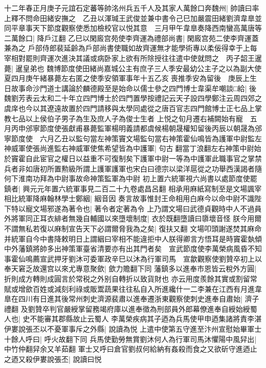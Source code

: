 十二年春正月庚子元誼石定蕃等帥洺州兵五千人及其家人萬餘口奔魏州|{
	帥讀曰率}
上釋不問命田緒安撫之　乙丑以渾瑊王武俊並兼中書令己巳加嚴震田緒劉濟韋臯並同平章事天下節度觀察使悉加檢校官以悦其意　三月甲午韋臯奏降西南蠻高萬唐等二萬餘口|{
	降戶江翻}
乙巳以閑廄宫苑使李齊運為禮部尚書|{
	閑廄宫苑二使李齊運蓋兼為之}
戶部侍郎裴延齡為戶部尚書使職如故齊運無才能學術專以柔佞得幸于上每宰相對罷則齊運次進決其議或病卧家上欲有所除授往往遣中使就問之　丙子韶王暹薨|{
	暹皇弟也}
魏博節度使田緒尚嘉城公主有庶子三人季安最幼公主子之以為副大使夏四月庚午緒暴薨左右匿之使季安領軍事年十五乙亥喪推季安為留後　庚辰上生日故事命沙門道士講論於麟德殿至是始命以儒士參之四門博士韋渠牟嘲談□給|{
	後魏劉芳表云太和二十年立四門博士於四門置學按禮記云天子設四學鄭注云周四郊之虞庠也今以其遼遠故置於四門請移與太學同處從之唐百官志四門館博士正七品上掌教七品以上侯伯子男子為生及庶人子為俊士生者}
上悦之旬月遷右補闕始有寵　五月丙申邠寧節度使張獻甫暴薨監軍楊明義請都虞候楊朝晟權知留後丙辰以朝晟為邠寧節度使　六月乙丑以監句當左神策竇文場監句當右神策霍仙鳴皆為護軍中尉監左神威軍使張尚進監右神威軍使焦希望皆為中護軍|{
	句古翻當丁浪翻左右神策中尉始於竇霍自此宦官之權日以益重不可復制矣下護軍中尉一等為中護軍此職事官之掌禁兵者非如唐初所置勲級所謂上護軍護軍也宋白曰德宗以梁洋扈從之功舉西漢謁者隨何下淮南功拜為中尉事故命神策監軍為中尉}
初上置六統軍視六尚書以處節度使罷鎮者|{
	興元元年置六統軍事見二百二十九卷處昌呂翻}
相承用麻紙寫制至是文場諷宰相比統軍降麻翰林學士鄭絪|{
	絪音因}
奏言故事惟封王命相用白麻今以命中尉不識陛下特以寵文場邪遂為著令也|{
	著令者定著為令}
上乃謂文場曰武德貞觀時中人不過員外將軍同正耳衣緋者無幾自輔國以來墮壞制度|{
	衣於既翻墮讀曰隳壞音怪}
朕今用爾不謂無私若復以麻制宣告天下必謂爾脅我為之矣|{
	復扶又翻}
文場叩頭謝遂焚其麻命并統軍自今中書降敕明日上謂絪曰宰相不能違拒中人朕得卿言方悟耳是時竇霍埶傾中外藩鎮將帥多出神策軍臺省清要亦有出其門者矣　宣武節度使李萬榮病風昏不知事霍仙鳴薦宣武押牙劉沐可委軍政辛巳以沐為行軍司馬　宣歙觀察使劉贊卒初上以奉天窘乏故還宫以來尤專意聚歛|{
	歛力贍翻下同}
藩鎮多以進奉市恩皆云稅外方圓|{
	折則成方轉則成圓言於常税之外别自轉折以致貨財也}
亦云用度羨餘其實或割留常賦或增歛百姓或減刻利祿或販鬻蔬果往往私自入所進纔什一二李兼在江西有月進韋臯在四川有日進其後常州刺史濟源裴肅以進奉遷浙東觀察使刺史進奉自肅始|{
	濟子禮翻}
及劉贊卒判官嚴綬掌留務竭府庫以進奉徵為刑部員外郎幕僚進奉自綬始綬蜀人也|{
	史不能審其郡縣故止云蜀人}
李萬榮疾病其子迺為兵馬使甲申迺集諸將責李湛伊婁說張丕以不憂軍事斥之外縣|{
	說讀為悦}
上遣中使第五守進至汴州宣慰始畢軍士十餘人呼曰|{
	呼火故翻下同}
兵馬使勤勞無賞劉沐何人為行軍司馬沐懼陽中風舁出|{
	中竹仲翻舁余又羊茹翻}
軍士又呼曰倉官劉叔何給納有姦殺而食之又欲斫守進迺止之迺又殺伊婁說張丕|{
	說讀曰悦}
